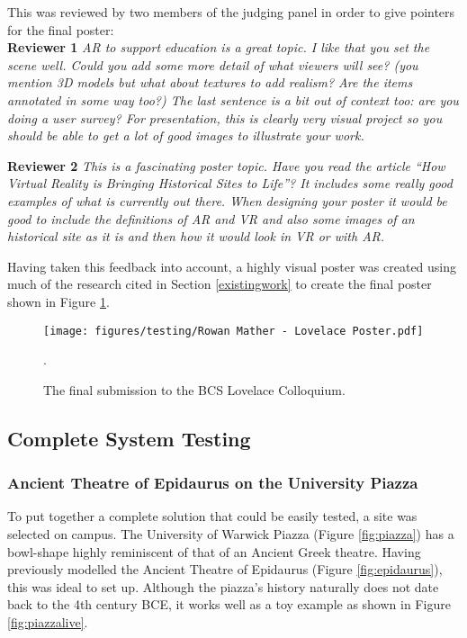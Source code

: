 \documentclass[12pt, a4paper]{article}
\begin{document}
This was reviewed by two members of the judging panel in order to give pointers for the final poster:\\
\textbf{Reviewer 1}
\textit{AR to support education is a great topic. I like that you set the scene well. Could you add some more detail of what viewers will see? (you mention 3D models but what about textures to add realism? Are the items annotated in some way too?) The last sentence is a bit out of context too: are you doing a user survey? For presentation, this is clearly very visual project so you should be able to get a lot of good images to illustrate your work.}

\textbf{Reviewer 2}
\textit{This is a fascinating poster topic. Have you read the article ``How Virtual Reality is Bringing Historical Sites to Life''? \cite{testing:reviewerpaper} It includes some really good examples of what is currently out there. When designing your poster it would be good to include the definitions of AR and VR and also some images of an historical site as it is and then how it would look in VR or with AR.}

Having taken this feedback into account, a highly visual poster was created using much of the research cited in Section \ref{existingwork} to create the final poster shown in Figure \ref{fig:bcsposter}. 

\begin{figure}[H]
\centering
    \texttt{[image: figures/testing/Rowan Mather - Lovelace Poster.pdf]}
        \caption{The final submission to the BCS Lovelace Colloquium.}.
        \label{fig:bcsposter}
\end{figure}

\newpage
\subsection{Complete System Testing}

\subsubsection{Ancient Theatre of Epidaurus on the University Piazza}
To put together a complete solution that could be easily tested, a site was selected on campus. The University of Warwick Piazza (Figure \ref{fig:piazza}) has a bowl-shape highly reminiscent of that of an Ancient Greek theatre. Having previously modelled the Ancient Theatre of Epidaurus (Figure \ref{fig:epidaurus}), this was ideal to set up. Although the piazza's history naturally does not date back to the 4th century BCE, it works well as a toy example as shown in Figure \ref{fig:piazzalive}.
\end{document}
